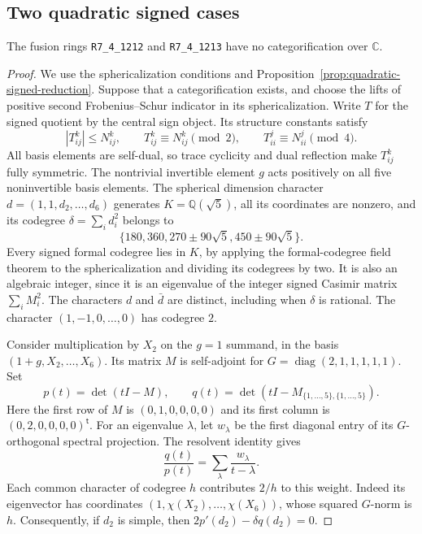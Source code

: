 \subsection{Two quadratic signed cases}
\label{subsec:signed-quadratic-completion}

\begin{proposition}
The fusion rings \texttt{R7\_4\_1212} and \texttt{R7\_4\_1213} have no
categorification over $\mathbb C$.
\end{proposition}

\begin{proof}
We use the sphericalization conditions and
Proposition~\ref{prop:quadratic-signed-reduction}.
Suppose that a categorification exists, and choose the lifts of positive
second Frobenius--Schur indicator in its sphericalization. Write $T$ for
the signed quotient by the central sign object. Its structure constants
satisfy
\[
 |T_{ij}^k|\leq N_{ij}^k,\qquad T_{ij}^k\equiv N_{ij}^k\pmod2,
 \qquad T_{ii}^j\equiv N_{ii}^j\pmod4.
\]
All basis elements are self-dual, so trace cyclicity and dual reflection
make $T_{ij}^k$ fully symmetric. The nontrivial invertible element $g$
acts positively on all five noninvertible basis elements. The spherical
dimension character $d=(1,1,d_2,\ldots,d_6)$ generates
$K=\mathbb Q(\sqrt5)$, all its coordinates are nonzero, and its codegree
$\delta=\sum_i d_i^2$ belongs to
\[
 \{180,360,270\pm90\sqrt5,450\pm90\sqrt5\}.
\]
Every signed formal codegree lies in $K$, by applying the formal-codegree
field theorem to the sphericalization and dividing its codegrees by two.
It is also an algebraic integer, since it is an eigenvalue of the integer
signed Casimir matrix $\sum_i M_i^2$.
The characters $d$ and $\bar d$ are distinct, including when $\delta$ is
rational. The character $(1,-1,0,\ldots,0)$ has codegree $2$.

Consider multiplication by $X_2$ on the $g=1$ summand, in the basis
$(1+g,X_2,\ldots,X_6)$. Its matrix $M$ is self-adjoint for
$G=\operatorname{diag}(2,1,1,1,1,1)$. Set
\[
 p(t)=\det(tI-M),\qquad
 q(t)=\det(tI-M_{\{1,\ldots,5\},\{1,\ldots,5\}}).
\]
Here the first row of $M$ is $(0,1,0,0,0,0)$ and its first column is
$(0,2,0,0,0,0)^{\mathsf t}$. For an eigenvalue $\lambda$, let $w_\lambda$
be the first diagonal entry of its $G$-orthogonal spectral projection.
The resolvent identity gives
\[
 \frac{q(t)}{p(t)}=\sum_\lambda\frac{w_\lambda}{t-\lambda}.
\]
Each common character of codegree $h$ contributes $2/h$ to this weight.
Indeed its eigenvector has coordinates
$(1,\chi(X_2),\ldots,\chi(X_6))$, whose squared $G$-norm is $h$.
Consequently, if $d_2$ is simple, then
$2p'(d_2)-\delta q(d_2)=0$.


\end{proof}
